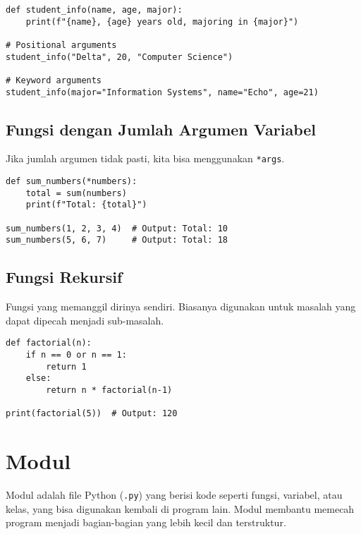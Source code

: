 \begin{lstlisting}[style=PythonStyle, caption={Kode Python: function_with_keyword_and_positional.py}]
def student_info(name, age, major):
    print(f"{name}, {age} years old, majoring in {major}")

# Positional arguments
student_info("Delta", 20, "Computer Science")

# Keyword arguments
student_info(major="Information Systems", name="Echo", age=21)
\end{lstlisting}

\subsection{Fungsi dengan Jumlah Argumen Variabel}

Jika jumlah argumen tidak pasti, kita bisa menggunakan \texttt{*args}.

\begin{lstlisting}[style=PythonStyle, caption={Kode Python: function_with_variable_arguments.py}]
def sum_numbers(*numbers):
    total = sum(numbers)
    print(f"Total: {total}")

sum_numbers(1, 2, 3, 4)  # Output: Total: 10
sum_numbers(5, 6, 7)     # Output: Total: 18
\end{lstlisting}

\subsection{Fungsi Rekursif}

Fungsi yang memanggil dirinya sendiri. Biasanya digunakan untuk masalah yang dapat dipecah menjadi sub-masalah.

\begin{lstlisting}[style=PythonStyle, caption={Kode Python: recursive_function.py}]
def factorial(n):
    if n == 0 or n == 1:
        return 1
    else:
        return n * factorial(n-1)

print(factorial(5))  # Output: 120
\end{lstlisting}

\section{Modul}

Modul adalah file Python (\texttt{.py}) yang berisi kode seperti fungsi, variabel, atau kelas, yang bisa digunakan kembali di program lain. Modul membantu memecah program menjadi bagian-bagian yang lebih kecil dan terstruktur.

